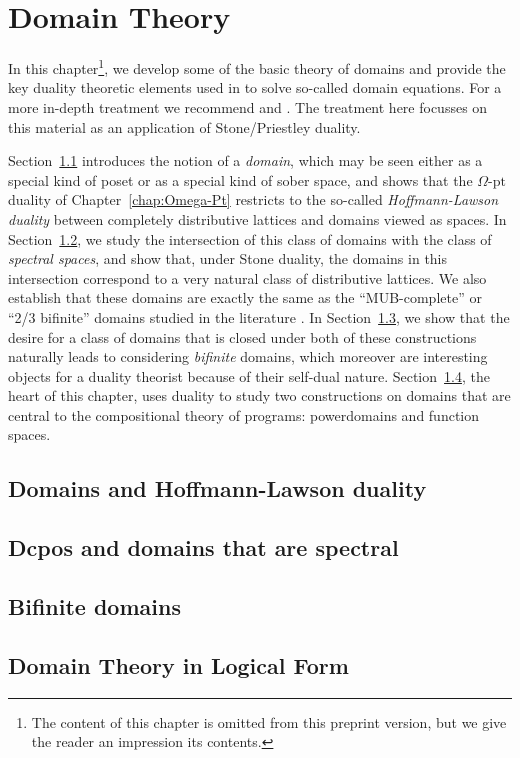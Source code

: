 \chapter{Domain Theory}\label{chap:DomThry}
In this chapter\footnote{The content of this chapter is omitted from this preprint version, but we give the reader an impression its contents.}, we develop some of the basic theory of domains and provide the key duality theoretic elements used in \cite{Abr} to solve so-called domain equations. For a more in-depth treatment we recommend \cite{Abr} and \cite{AbJu94}. The treatment here focusses on this material as an application of Stone/Priestley duality.

Section~\ref{sec:dom} introduces the notion of a \emph{domain}, which may be seen either as a special kind of poset or as a special kind of sober space, and shows that the $\Omega$-$\mathrm{pt}$ duality of Chapter~\ref{chap:Omega-Pt} restricts to the so-called \emph{Hoffmann-Lawson duality} between completely distributive lattices and domains viewed as spaces. In Section~\ref{sec:dom-Stone}, we study the intersection of this class of domains with the class of \emph{spectral spaces}, and show that, under Stone duality, the domains in this intersection correspond to a very natural class of distributive lattices. We also establish that these domains are exactly the same as the ``MUB-complete'' or ``2/3 bifinite'' domains studied in the literature \cite{Abr, AbJu94}.  In Section~\ref{sec:bifinite}, we show that the desire for a class of domains that is closed under both of these constructions naturally leads to considering \emph{bifinite} domains, which moreover are interesting objects for a duality theorist because of their self-dual nature.  Section~\ref{sec:DTLF}, the heart of this chapter, uses duality to study two constructions on domains that are central to the compositional theory of programs: powerdomains and function spaces.

\section{Domains and Hoffmann-Lawson duality}\label{sec:dom}

\section{Dcpos and domains that are spectral}\label{sec:dom-Stone}

\section{Bifinite domains}\label{sec:bifinite}

\section{Domain Theory in Logical Form}\label{sec:DTLF}


